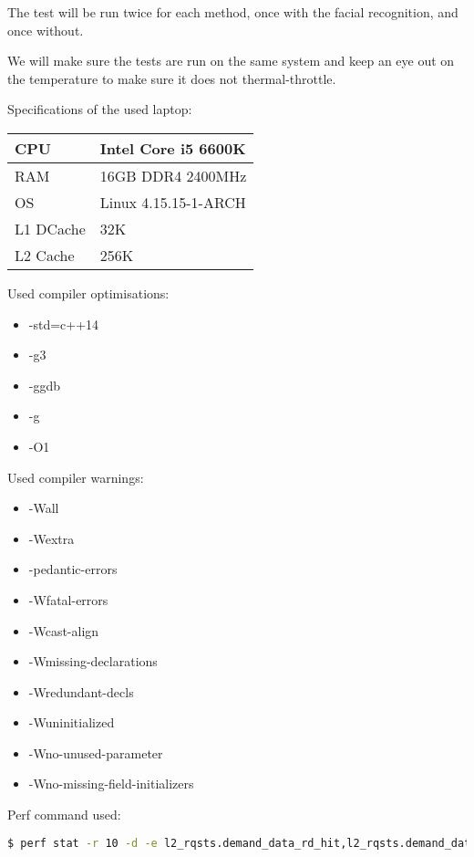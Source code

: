 \documentclass[a4paper]{article}
\begin{document}
The test will be run twice for each method, once with the facial recognition, and once without.

We will make sure the tests are run on the same system and keep an eye out on the temperature to make sure it does not thermal-throttle.

Specifications of the used laptop:
\begin{center}
    \begin{tabular}{ | l | l |}
    \hline
    CPU & Intel Core i5 6600K \cite{ARK} \\ \hline
    RAM & 16GB DDR4 2400MHz \\ \hline
    OS & Linux 4.15.15-1-ARCH \\ \hline
    L1 DCache & 32K \\ \hline
    L2 Cache & 256K \\ \hline
    \end{tabular}
\end{center}

Used compiler optimisations:
\begin{itemize}[noitemsep,nolistsep]
\item -std=c++14
\item -g3
\item -ggdb
\item -g
\item -O1
\end{itemize}

Used compiler warnings:
\begin{itemize}[noitemsep,nolistsep]
\item -Wall
\item -Wextra
\item -pedantic-errors
\item -Wfatal-errors
\item -Wcast-align
\item -Wmissing-declarations
\item -Wredundant-decls
\item -Wuninitialized
\item -Wno-unused-parameter
\item -Wno-missing-field-initializers
\end{itemize}

Perf command used:
\begin{lstlisting}[language=bash]
	$ perf stat -r 10 -d -e l2_rqsts.demand_data_rd_hit,l2_rqsts.demand_data_rd_miss ./vissen
\end{lstlisting}

\newpage
\end{document}
